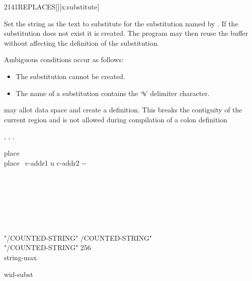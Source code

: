 \begin{worddef}{2141}{REPLACES}[][x:substitute]
\item {}

	Set the string  as the text to substitute for
	the substitution named by .
	If the substitution does not exist it is created.
	The program may then reuse the buffer  without
	affecting the definition of the substitution.

	Ambiguous conditions occur as follows:
	\begin{itemize}
	\item The substitution cannot be created.
	\item The name of a substitution contains the `\texttt{\%}' delimiter character.
	\end{itemize}

	 may allot data space and create a definition.  This breaks
	the contiguity of the current region and is not allowed during compilation
	of a colon definition
  
\see {},
	,
	.

	\begin{implement}

		\word[tools]{[UNDEFINED]} place \word[tools]{[IF]} \\
		\tab \word{:} place \tab {} \ c-addr1 u c-addr2 -{}- \\
		\tab {}  \\
		\tab {}  \\
		\tab[2]   \\
		  \word{+}   \\
		\tab[2]   \\
		\tab \word{;} \\
		\word[tools]{[THEN]}

		\word{:} "/COUNTED-STRING"  /COUNTED-STRING" \word{;} \\
		"/COUNTED-STRING"   \word[tools]{[IF]} 256 \word[tools]{[THEN]} \\
		  string-max

		  wid-subst \\
		 


\end{implement}
\end{worddef}
